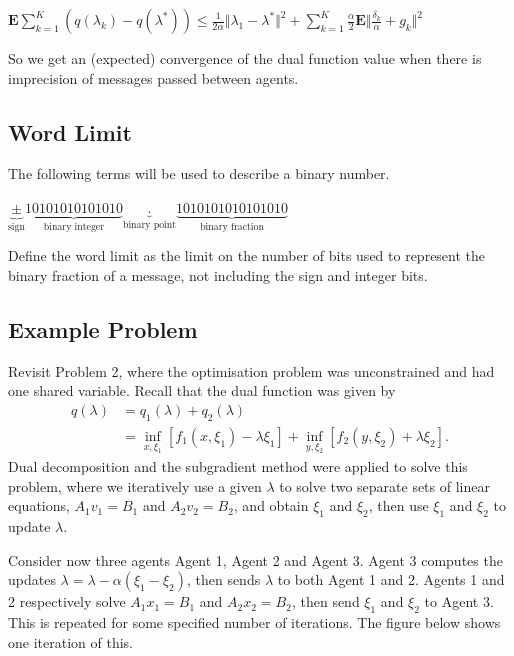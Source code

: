 \documentclass[12pt]{article}
\begin{document}
$\textbf{E}\sum\limits_{k=1}^K (q(\lambda_k)-q(\lambda^*)) \leq \frac{1}{2\alpha} \Vert \lambda_1-\lambda^*\Vert^2+ \sum\limits_{k=1}^K \frac{\alpha}{2}\textbf{E}\Vert \frac{\delta_k}{\alpha} + g_k \Vert^2$

So we get an (expected) convergence of the dual function value when there is imprecision of messages passed between agents. 

\subsection*{Word Limit}

The following terms will be used to describe a binary number.
\begin{center}
	$\underbrace{\pm}_{\text{sign}}\underbrace{10101010101010}_{\text{binary integer}}\underbrace{.}_{\text{binary point}}\underbrace{1010101010101010}_{\text{binary fraction}}$
\end{center}


Define the word limit as the limit on the number of bits used to represent the binary fraction of a message, not including the sign and integer bits.

\subsection*{Example Problem}
Revisit Problem 2, where the optimisation problem was unconstrained and had one shared variable. Recall that the dual function was given by
\begin{align*}
q(\lambda)&=q_1(\lambda)+q_2(\lambda)\\
&=\inf_{x,\xi_1}[f_1(x,\xi_1)-\lambda\xi_1]+\inf_{y,\xi_2}[f_2(y,\xi_2)+\lambda\xi_2].
\end{align*}
Dual decomposition and the subgradient method were applied to solve this problem, where we iteratively use a given $\lambda$ to solve two separate sets of linear equations, $A_1v_1=B_1$ and $A_2v_2=B_2$, and obtain $\xi_1$ and $\xi_2$, then use $\xi_1$ and $\xi_2$ to update $\lambda$.

Consider now three agents Agent 1, Agent 2 and Agent 3. Agent 3 computes the updates $\lambda=\lambda-\alpha(\xi_1-\xi_2)$, then sends $\lambda$ to both Agent 1 and 2. Agents 1 and 2 respectively solve $A_1x_1=B_1$ and $A_2x_2=B_2$, then send $\xi_1$ and $\xi_2$ to Agent 3. This is repeated for some specified number of iterations. The figure below shows one iteration of this.
\end{document}
